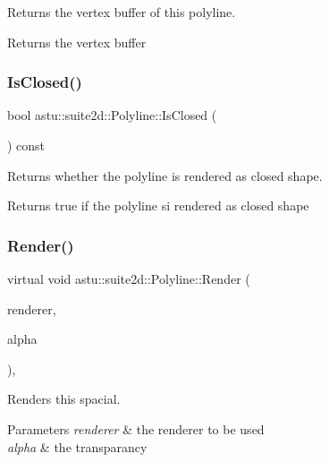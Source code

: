 Returns the vertex buffer of this polyline.

\begin{DoxyReturn}{Returns}
the vertex buffer 
\end{DoxyReturn}
\mbox{\label{classastu_1_1suite2d_1_1Polyline_a3785365e970d6bf6c083730458569e79}} 
\subsubsection{\texorpdfstring{Is\+Closed()}{IsClosed()}}
{\footnotesize\ttfamily bool astu\+::suite2d\+::\+Polyline\+::\+Is\+Closed (\begin{DoxyParamCaption}{ }\end{DoxyParamCaption}) const\hspace{0.3cm}{\ttfamily [inline]}}

Returns whether the polyline is rendered as closed shape.

\begin{DoxyReturn}{Returns}
{\ttfamily true} if the polyline si rendered as closed shape 
\end{DoxyReturn}
\mbox{\label{classastu_1_1suite2d_1_1Polyline_ad4aef126b57b93beba4ab03c01403406}} 
\subsubsection{\texorpdfstring{Render()}{Render()}}
{\footnotesize\ttfamily virtual void astu\+::suite2d\+::\+Polyline\+::\+Render (\begin{DoxyParamCaption}\item[{\hyperlink{classastu_1_1suite2d_1_1SceneRenderer2D}{Scene\+Renderer2D} \&}]{renderer,  }\item[{float}]{alpha }\end{DoxyParamCaption})\hspace{0.3cm}{\ttfamily [override]}, {\ttfamily [virtual]}}

Renders this spacial.


\begin{DoxyParams}{Parameters}
{\em renderer} & the renderer to be used \\
\hline
{\em alpha} & the transparancy \\
\hline
\end{DoxyParams}


